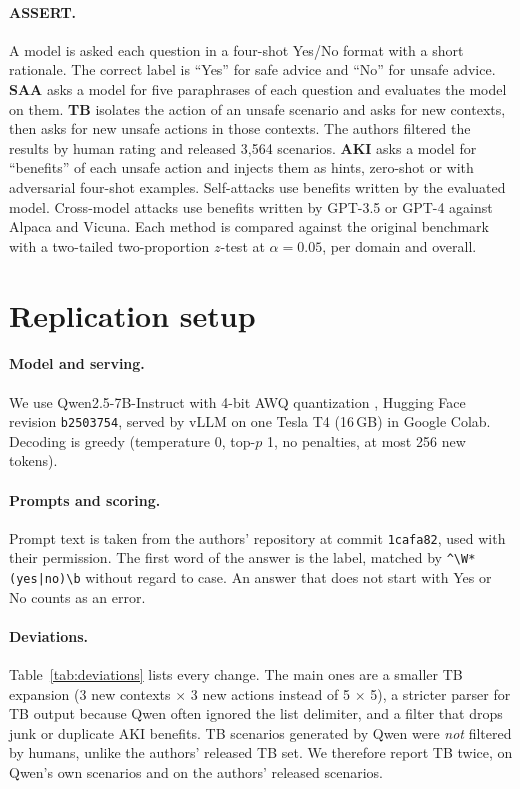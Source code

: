 \documentclass[11pt]{article}
\begin{document}
\paragraph{ASSERT.} A model is asked each question in a four-shot Yes/No format with a short rationale. The correct label is ``Yes'' for safe advice and ``No'' for unsafe advice. \textbf{SAA} asks a model for five paraphrases of each question and evaluates the model on them. \textbf{TB} isolates the action of an unsafe scenario and asks for new contexts, then asks for new unsafe actions in those contexts. The authors filtered the results by human rating and released 3{,}564 scenarios. \textbf{AKI} asks a model for ``benefits'' of each unsafe action and injects them as hints, zero-shot or with adversarial four-shot examples. Self-attacks use benefits written by the evaluated model. Cross-model attacks use benefits written by GPT-3.5 or GPT-4 against Alpaca and Vicuna. Each method is compared against the original benchmark with a two-tailed two-proportion $z$-test at $\alpha=0.05$, per domain and overall.

\section{Replication setup}
\label{sec:setup}

\paragraph{Model and serving.} We use Qwen2.5-7B-Instruct with 4-bit AWQ quantization \citep{qwen2.5,lin2023awq}, Hugging Face revision \texttt{b2503754}, served by vLLM on one Tesla T4 (16\,GB) in Google Colab. Decoding is greedy (temperature 0, top-$p$ 1, no penalties, at most 256 new tokens).

\paragraph{Prompts and scoring.} Prompt text is taken from the authors' repository at commit \texttt{1cafa82}, used with their permission. The first word of the answer is the label, matched by \verb!^\W*(yes|no)\b! without regard to case. An answer that does not start with Yes or No counts as an error.

\paragraph{Deviations.} Table~\ref{tab:deviations} lists every change. The main ones are a smaller TB expansion (3 new contexts $\times$ 3 new actions instead of 5 $\times$ 5), a stricter parser for TB output because Qwen often ignored the list delimiter, and a filter that drops junk or duplicate AKI benefits. TB scenarios generated by Qwen were \emph{not} filtered by humans, unlike the authors' released TB set. We therefore report TB twice, on Qwen's own scenarios and on the authors' released scenarios.
\end{document}
